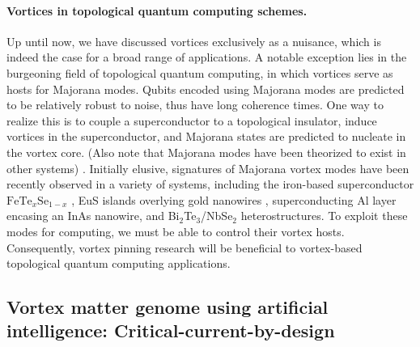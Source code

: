 \documentclass[%
 aip,
 amsmath,amssymb,
 reprint,%
floatfix]{revtex4-1}
\begin{document}
\paragraph{Vortices in topological quantum computing schemes.}
Up until now, we have discussed vortices exclusively as a nuisance, which is indeed the case for a broad range of applications.  A notable exception lies in the burgeoning field of topological quantum computing, in which vortices serve as hosts for Majorana modes\cite{Liu2019}.  Qubits encoded using Majorana modes are predicted to be relatively robust to noise, thus have long coherence times. One way to realize this is to couple a superconductor to a topological insulator, induce vortices in the superconductor, and Majorana states are predicted to nucleate in the vortex core. (Also note that Majorana modes have been theorized to exist in other systems) \cite{Grosfeld2011, Nenoff2019, You2014, DasSarma2012, Bjorn2012, Liang2016, Alicea_2012}.  Initially elusive, signatures of Majorana vortex modes have been recently observed in a variety of systems, including the iron-based superconductor $\mathrm{Fe}\mathrm{Te}_{x}\mathrm{Se}_{1-x}$ \cite{Chiueaay2020, Ghaemi2020}, EuS islands overlying gold nanowires \cite{Manna2020}, superconducting Al layer encasing an InAs nanowire\cite{Vaitiekenaseaav2020}, and Bi$_2$Te$_3$/NbSe$_2$ heterostructures\cite{JFJia2016}. To exploit these modes for computing, we must be able to control their vortex hosts.  Consequently, vortex pinning research will be beneficial to vortex-based topological quantum computing applications.

\subsection{Vortex matter genome using artificial intelligence: Critical-current-by-design}\label{ssec:AI}
\end{document}
